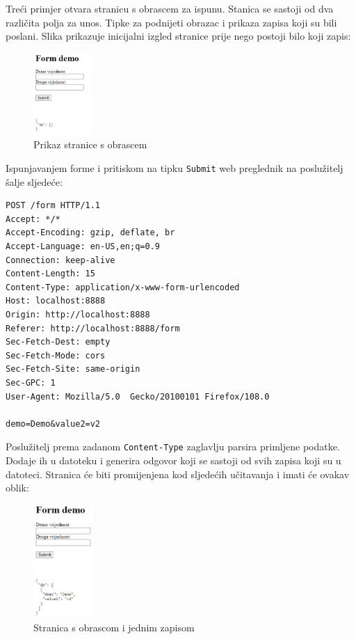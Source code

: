 \documentclass[]{foi} %
\begin{document}
Treći primjer otvara stranicu s obrascem za ispunu. Stanica se sastoji od dva različita
polja za unos. Tipke za podnijeti obrazac i prikaza zapisa koji su bili poslani. Slika
prikazuje inicijalni izgled stranice prije nego postoji bilo koji zapis:
\begin{figure}[h!]
    \centering
    \includegraphics[width=0.2\textwidth]{slike/form.png}
    \caption{Prikaz stranice s obrascem}
    \label{fig:form}
\end{figure}

Ispunjavanjem forme i pritiskom na tipku \texttt{Submit} web preglednik na poslužitelj 
šalje sljedeće:
\begin{verbatim}
POST /form HTTP/1.1
Accept: */*
Accept-Encoding: gzip, deflate, br
Accept-Language: en-US,en;q=0.9
Connection: keep-alive
Content-Length: 15
Content-Type: application/x-www-form-urlencoded
Host: localhost:8888
Origin: http://localhost:8888
Referer: http://localhost:8888/form
Sec-Fetch-Dest: empty
Sec-Fetch-Mode: cors
Sec-Fetch-Site: same-origin
Sec-GPC: 1
User-Agent: Mozilla/5.0  Gecko/20100101 Firefox/108.0

demo=Demo&value2=v2
\end{verbatim}
Poslužitelj prema zadanom \texttt{Content-Type} zaglavlju parsira
primljene podatke. Dodaje ih u datoteku i generira odgovor koji se sastoji
od svih zapisa koji su u datoteci. Stranica će biti promijenjena kod sljedećih
učitavanja i imati će ovakav oblik:
\begin{figure}[h]
    \centering
    \includegraphics[width=0.2\textwidth]{slike/form2.png}
    \caption{Stranica s obrascom i jednim zapisom}
    \label{fig:form2}
\end{figure}
\end{document}

